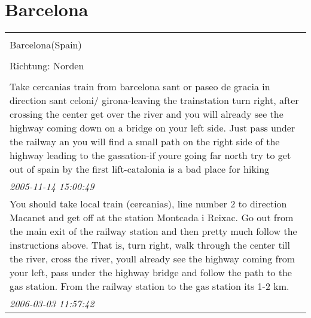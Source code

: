 \documentclass[a4paper,12pt]{article}
\begin{document}
\section{Barcelona}
\begin{tabular}{|p{13cm}|}
\hline\\
Barcelona(Spain)\\
\\
Richtung: Norden \\
\hline\\
Take cercanias train from barcelona sant or paseo de gracia in direction sant celoni/ girona-leaving the trainstation turn right, after crossing the center get over the river and you will already see the highway coming down on a bridge on your left side. Just pass under the railway an you will find a small path on the right side of the highway leading to the gassation-if youre going far north try to get out of spain by the first lift-catalonia is a bad place for hiking \\
\textit{ 2005-11-14 15:00:49 }\\\hline You should take local train (cercanias), line number 2 to direction Macanet and get off at the station Montcada i Reixac. Go out from the main exit of the railway station and then pretty much follow the instructions above. That is, turn right, walk through the center till the river, cross the river, youll already see the highway coming from your left, pass under the highway bridge and follow the path to the gas station. From the railway station to the gas station its 1-2 km. \\
\textit{ 2006-03-03 11:57:42 }\\\hline
\end{tabular}
\end{document}
